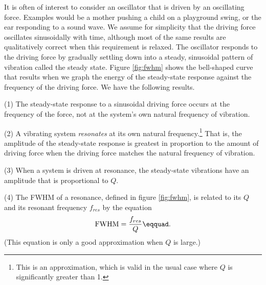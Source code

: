 It is often of interest to consider an oscillator that is driven by an oscillating force.
Examples would be a mother pushing a child on a playground swing, or the ear responding to
a sound wave. We assume for simplicity that the driving force oscillates sinusoidally with
time, although most of the same results are qualitatively correct when this requirement is relaxed.
The oscillator responds to the driving force by gradually settling down into a steady, sinusoidal
pattern of vibration called the steady state. Figure \ref{fig:fwhm} shows the bell-shaped curve
that results when we graph the energy of the steady-state response against the frequency of the driving force.
We have the following results.


(1) The steady-state response to a sinusoidal driving force
occurs at the frequency of the force, not at the system's
own natural frequency of vibration.

(2) A vibrating system \emph{resonates} at
its own natural frequency.\footnote{This is
an approximation, which is valid in the usual case where $Q$ is significantly greater than 1.} That is, the amplitude of the
steady-state response is greatest in proportion to the
amount of driving force when the driving force matches the
natural frequency of vibration.

(3) When a system is driven at resonance, the steady-state
vibrations have an amplitude that is proportional to $Q$.

(4) The FWHM of a resonance, defined in figure \ref{fig:fwhm}, is related to its $Q$ and its
resonant frequency $f_{res}$ by the equation
\begin{equation*}
 \text{FWHM} = \frac{f_{res}}{Q}\eqquad.
\end{equation*}
(This equation is only a good approximation when $Q$ is large.)

